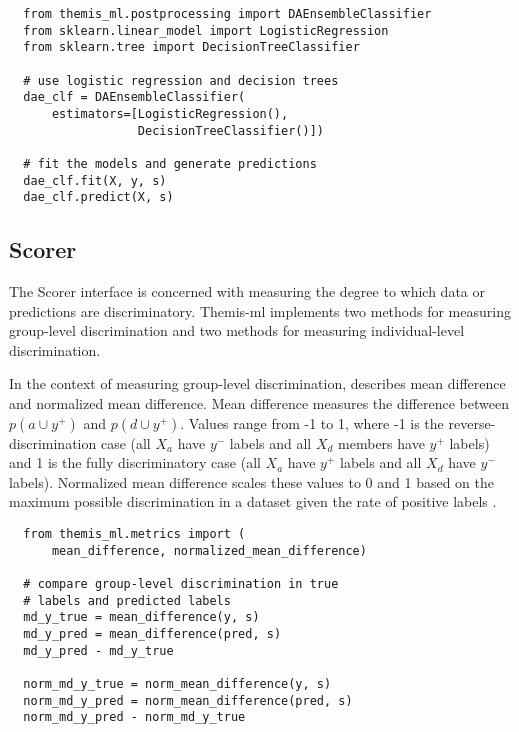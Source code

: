 \documentclass{acm_proc_article-sp}
\begin{document}
\begin{verbatim}
  from themis_ml.postprocessing import DAEnsembleClassifier
  from sklearn.linear_model import LogisticRegression
  from sklearn.tree import DecisionTreeClassifier

  # use logistic regression and decision trees
  dae_clf = DAEnsembleClassifier(
      estimators=[LogisticRegression(),
                  DecisionTreeClassifier()])

  # fit the models and generate predictions
  dae_clf.fit(X, y, s)
  dae_clf.predict(X, s)
\end{verbatim}

\subsection{Scorer}

The Scorer interface is concerned with measuring the degree to which data or
predictions are discriminatory. Themis-ml implements two methods for measuring
group-level discrimination and two methods for measuring individual-level
discrimination.

In the context of measuring group-level discrimination,
\cite{zliobaite2015survey} describes mean difference and normalized mean
difference. Mean difference measures the difference between \(p(a \cup y^{+})\)
and \(p(d \cup y^{+})\). Values range from -1 to 1, where -1 is the reverse-
discrimination case (all \(X_a\) have \(y^{-}\) labels and all \(X_d\) members
have \(y^{+}\) labels) and 1 is the fully discriminatory case (all \(X_a\) have
\(y^{+}\) labels and all \(X_d\) have \(y^{-}\) labels). Normalized mean
difference scales these values to 0 and 1 based on the maximum possible
discrimination in a dataset given the rate of positive labels
\cite{zliobaite2015survey}.

\begin{verbatim}
  from themis_ml.metrics import (
      mean_difference, normalized_mean_difference)

  # compare group-level discrimination in true
  # labels and predicted labels
  md_y_true = mean_difference(y, s)
  md_y_pred = mean_difference(pred, s)
  md_y_pred - md_y_true

  norm_md_y_true = norm_mean_difference(y, s)
  norm_md_y_pred = norm_mean_difference(pred, s)
  norm_md_y_pred - norm_md_y_true
\end{verbatim}
\end{document}
